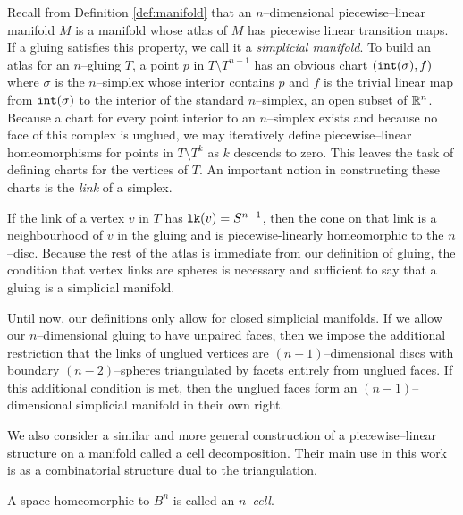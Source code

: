 Recall from Definition \ref{def:manifold} that an $n$--dimensional piecewise--linear manifold $M$ is a manifold whose atlas of $M$ has piecewise linear transition maps.
If a gluing satisfies this property, we call it a \emph{simplicial manifold}.
To build an atlas for an $n$--gluing $T$, a point $p$ in $T\setminus T^{n-1}$ has an obvious chart $(\mathtt{int}(\sigma),f)$ where $\sigma$ is the $n$--simplex whose interior contains $p$ and $f$ is the trivial linear map from $\mathtt{int}(\sigma)$ to the interior of the standard $n$--simplex, an open subset of $\mathbb{R}^n$.
Because a chart for every point interior to an $n$--simplex exists and because no face of this complex is unglued, we may iteratively define piecewise--linear homeomorphisms for points in $T\setminus T^{k}$ as $k$ descends to zero.
This leaves the task of defining charts for the vertices of $T$.
An important notion in constructing these charts is the \emph{link} of a simplex.

\begin{defn}
\end{defn}

If the link of a vertex $v$ in $T$ has $\texttt{lk}(v)=S^{n-1}$, then the cone on that link is a neighbourhood of $v$ in the gluing and is piecewise-linearly homeomorphic to the $n$--disc.
Because the rest of the atlas is immediate from our definition of gluing, the condition that vertex links are spheres is necessary and sufficient to say that a gluing is a simplicial manifold.

Until now, our definitions only allow for closed simplicial manifolds.
If we allow our $n$--dimensional gluing to have unpaired faces, then we impose the additional restriction that the links of unglued vertices are $(n-1)$--dimensional discs with boundary $(n-2)$--spheres triangulated by facets entirely from unglued faces.
If this additional condition is met, then the unglued faces form an $(n-1)$--dimensional simplicial manifold in their own right.

We also consider a similar and more general construction of a piecewise--linear structure on a manifold called a cell decomposition.
Their main use in this work is as a combinatorial structure dual to the triangulation.

\begin{defn}
  A space homeomorphic to $B^n$ is called an \emph{$n$--cell}.
\end{defn}





